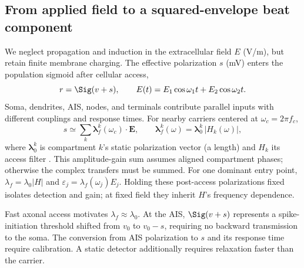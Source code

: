 \subsection{From applied field to a squared-envelope beat component}\label{sec:coupling}
We neglect propagation and induction in the extracellular field $E$ (V/m),
but retain finite membrane charging. The effective polarization $s$ (mV)
enters the population sigmoid after cellular access,
\begin{equation}
r=\Sig(v+s),\qquad
E(t)=E_1\cos\omega_1 t+E_2\cos\omega_2 t .
\label{eq:coupling}
\end{equation}
Soma, dendrites, AIS, nodes, and terminals contribute parallel inputs with
different couplings and response times. For nearby carriers centered at
$\omega_c=2\pi f_c$,
\begin{equation}
s\simeq\sum_k \boldsymbol\lambda^k_f(\omega_c)\!\cdot\!\mathbf E,\qquad
\boldsymbol\lambda^k_f(\omega)=\boldsymbol\lambda^k_0\,\lvert H_k(\omega)\rvert,
\label{eq:doors}
\end{equation}
where $\boldsymbol\lambda^k_0$ is compartment $k$'s static polarization vector
(a length) and $H_k$ its access filter \cite{ruffini2025rosetta,galangadea2023}.
This amplitude-gain sum assumes aligned compartment phases; otherwise the
complex transfers must be summed. For one dominant entry point,
$\lambda_f=\lambda_0|H|$ and $\varepsilon_j=\lambda_f(\omega_j)E_j$.
Holding these post-access polarizations fixed isolates detection and gain;
at fixed field they inherit $H$'s frequency dependence.

Fast axonal access motivates $\lambda_f\approx\lambda_0$. At the AIS,
$\Sig(v+s)$ represents a spike-initiation threshold shifted from $v_0$ to
$v_0-s$, requiring no backward transmission to the soma. The conversion from
AIS polarization to $s$ and its response time require calibration. A static
detector additionally requires relaxation faster than the carrier.

